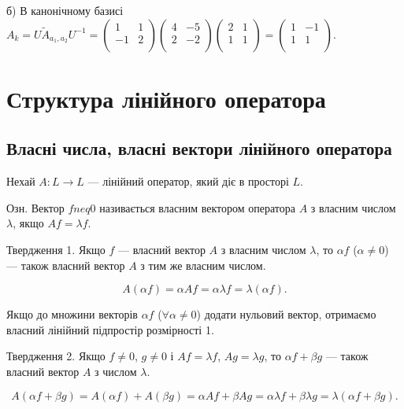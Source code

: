б) В канонічному базисі $A_k = U \tilde{A}_{a_1, a_2} U^{-1} = \begin{pmatrix}
	1 & 1 \\
	-1 & 2 \\
\end{pmatrix} \begin{pmatrix}
	4 & -5 \\
	2 & -2 \\
\end{pmatrix} \begin{pmatrix}
	2 & 1 \\
	1 & 1 \\
\end{pmatrix} = \begin{pmatrix}
	1 & -1 \\
	1 & 1 \\
\end{pmatrix}.$

\section{Структура лінійного оператора}

\subsection*{Власні числа, власні вектори лінійного оператора}

Нехай $A: L \rightarrow L$ --- лінійний оператор, який діє в просторі $L$.

Озн. Вектор $f neq 0$ називається власним вектором оператора $A$ з
власним числом $\lambda$, якщо $A f = \lambda f$.

Твердження 1. Якщо $f$ --- власний вектор $A$ з власним числом $\lambda$, то $\alpha f$
($\alpha \neq 0$) --- також власний вектор $A$ з тим же власним числом.

$$A(\alpha f) = \alpha A f = \alpha \lambda f = \lambda(\alpha f).$$

Якщо до множини векторів $\alpha f$ ($\forall \alpha \neq 0$) додати нульовий вектор,
отримаємо власний лінійний підпростір розмірності 1.

Твердження 2. Якщо $f \neq 0$, $g \neq 0$ і $A f = \lambda f$, $A g = \lambda g$, то $\alpha f + \beta g$ ---
також власний вектор $A$ з числом $\lambda$.

$$A(\alpha f + \beta g) = A(\alpha f) + A(\beta g) = \alpha A f + \beta A g
= \alpha \lambda f + \beta \lambda g = \lambda(\alpha f + \beta g).$$

